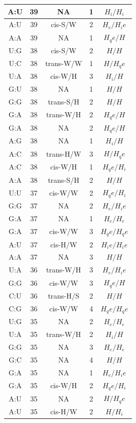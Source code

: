 \begin{center}
\begin{longtable}{c|c|c|c|c}
A:U & 39 & NA & 1 & $H_i/H_i$ \\  \hline
A:U & 39 & cis-S/W & 2 & $H_e/H_ie$ \\  \hline
A:A & 39 & NA & 1 & $H_qe/H$ \\  \hline
U:G & 38 & cis-S/W & 2 & $H/H$ \\  \hline
U:C & 38 & trans-W/W & 1 & $H/H_qe$ \\  \hline
U:A & 38 & cis-W/H & 3 & $H_i/H$ \\  \hline
G:U & 38 & NA & 1 & $H/H$ \\  \hline
G:G & 38 & trans-S/H & 2 & $H/H$ \\  \hline
G:A & 38 & trans-W/H & 2 & $H_qe/H$ \\  \hline
G:A & 38 & NA & 2 & $H_qe/H$ \\  \hline
A:G & 38 & NA & 1 & $H_i/H$ \\  \hline
A:C & 38 & trans-H/W & 3 & $H/H_qe$ \\  \hline
A:C & 38 & cis-W/H & 1 & $H_qe/H_i$ \\  \hline
A:A & 38 & trans-S/H & 2 & $H/H$ \\  \hline
U:U & 37 & cis-W/W & 2 & $H_qe/H_i$ \\  \hline
G:G & 37 & NA & 2 & $H_e/H_ie$ \\  \hline
G:A & 37 & NA & 1 & $H_e/H_e$ \\  \hline
G:A & 37 & cis-W/W & 3 & $H_qe/H_qe$ \\  \hline
A:U & 37 & cis-H/W & 2 & $H_ie/H_ie$ \\  \hline
A:A & 37 & NA & 3 & $H/H$ \\  \hline
U:A & 36 & trans-W/H & 3 & $H_e/H_ie$ \\  \hline
G:G & 36 & cis-W/W & 3 & $H_qe/H$ \\  \hline
C:U & 36 & trans-H/S & 2 & $H/H$ \\  \hline
C:G & 36 & cis-W/W & 4 & $H_qe/H_qe$ \\  \hline
U:G & 35 & NA & 2 & $H_e/H_e$ \\  \hline
U:A & 35 & trans-W/H & 2 & $H_i/H$ \\  \hline
G:G & 35 & NA & 3 & $H_e/H_e$ \\  \hline
G:C & 35 & NA & 4 & $H/H$ \\  \hline
G:A & 35 & NA & 1 & $H_e/H_ie$ \\  \hline
G:A & 35 & cis-W/H & 2 & $H_qe/H_i$ \\  \hline
A:U & 35 & NA & 2 & $H/H_qe$ \\  \hline
A:U & 35 & cis-H/W & 2 & $H/H_i$ \\  \hline

\end{longtable}
\end{center}
